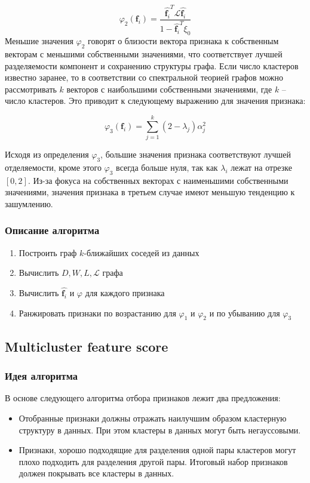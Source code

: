 \begin{equation}
	\varphi_2(\mathbf{f}_i) = \frac{\widehat{\mathbf{f}_i}^T \mathcal{L} \widehat{\mathbf{f}_i}}{1 - \widehat{\mathbf{f}_i}^T \xi_0}
\end{equation} 
Меньшие значения $\varphi_2$ говорят о близости вектора признака к собственным векторам с меньшими собственными значениями, что соответствует лучшей разделяемости компонент и сохранению структуры графа. Если число кластеров известно заранее, то в соответствии со спектральной теорией графов можно рассмотривать $k$ векторов с наибольшими собственными значениями, где $k$ -- число кластеров. Это приводит к следующему выражению для значения признака:

\begin{equation}
	\varphi_3(\mathbf{f}_i) = \sum_{j=1}^{k}(2 - \lambda_j)\alpha_j^2
\end{equation}

Исходя из определения $\varphi_3$, большие значения признака соответствуют лучшей отделяемости, кроме этого $\varphi_3$ всегда больше нуля, так как $\lambda_i$ лежат на отрезке $[0, 2]$. Из-за фокуса на собственных векторах с наименьшими собственными значениями, значения признака в третьем случае имеют меньшую тенденцию к зашумлению. 

\subsubsection{Описание алгоритма}
\begin{enumerate}
	\item Построить граф $k$-ближайших соседей из данных
	\item Вычислить $D, W, L, \mathcal{L}$ графа
	\item Вычислить $\widehat{\mathbf{f}_i}$ и $\varphi$ для каждого признака
	\item Ранжировать признаки по возрастанию для $\varphi_1$ и $\varphi_{2}$ и по убыванию для $\varphi_3$
\end{enumerate}

\subsection{Multicluster feature score}

\subsubsection{Идея алгоритма}
	В основе следующего алгоритма отбора признаков лежит два предложения:
	\begin{itemize}
		\item Отобранные признаки должны отражать наилучшим образом кластерную структуру в данных. При этом кластеры в данных могут быть негауссовыми.
		\item Признаки, хорошо подходящие для разделения одной пары кластеров могут плохо подходить для разделения другой пары. Итоговый набор признаков должен покрывать все кластеры в данных.
	\end{itemize}

